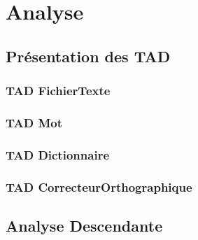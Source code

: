 \section{Analyse}
	\subsection{Présentation des TAD}
		\subsubsection{TAD FichierTexte}
			
			
		\subsubsection{TAD Mot}
			
			
		\subsubsection{TAD Dictionnaire}
			
			
		\subsubsection{TAD CorrecteurOrthographique}
			
			
	\subsection{Analyse Descendante}
